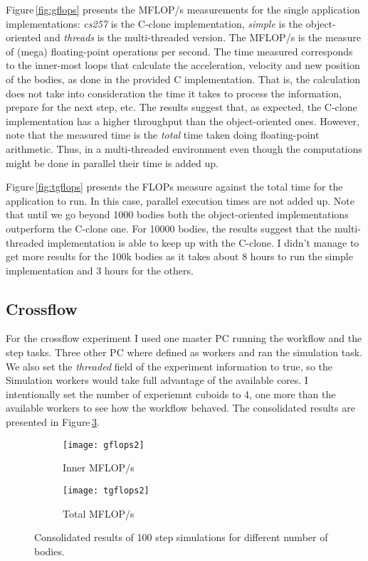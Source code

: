 \documentclass[11pt,a4paper]{article}
\begin{document}
Figure\,\ref{fig:gflops} presents the MFLOP/s measurements for the single application implementations: \emph{cs257} is the C-clone implementation, \emph{simple} is the object-oriented and \emph{threads} is the multi-threaded version.
The MFLOP/s is the measure of (mega) floating-point operations per second.
The time measured corresponds to the inner-most loops that calculate the acceleration, velocity and new position of the bodies, as done in the provided C implementation.
That is, the calculation does not take into consideration the time it takes to process the information, prepare for the next step, etc.
The results suggest that, as expected, the C-clone implementation has a higher throughput than the object-oriented ones.
However, note that the measured time is the \emph{total} time taken doing floating-point arithmetic.
Thus, in a multi-threaded environment even though the computations might be done in parallel their time is added up.

Figure\,\ref{fig:tgflops} presents the FLOPs measure against the total time for the application to run.
In this case, parallel execution times are not added up.
Note that until we go beyond 1000 bodies both the object-oriented implementations outperform the C-clone one.
For 10000 bodies, the results suggest that the multi-threaded implementation is able to keep up with the C-clone.
I didn't manage to get more results for the 100k bodies as it takes about 8 hours to run the simple implementation and 3 hours for the others.

\subsection{Crossflow}

For the crossflow experiment I used one master PC running the workflow and the step tasks.
Three other PC where defined as workers and ran the simulation task.
We also set the \emph{threaded} field of the experiment information to true, so the Simulation workers would take full advantage of the available cores.
I intentionally set the number of experiemnt cuboids to 4, one more than the available workers to see how the workflow behaved.
The consolidated results are presented in Figure\,\ref{fig:crossflow}.

\begin{figure}
    \centering
    \begin{subfigure}{.5\textwidth}
        \centering
        \texttt{[image: gflops2]}
        \caption{Inner MFLOP/s}
        \label{fig:gflops2}
    \end{subfigure}%
    \begin{subfigure}{.5\textwidth}
        \centering
        \texttt{[image: tgflops2]}
        \caption{Total MFLOP/s}
        \label{fig:tgflops2}
    \end{subfigure}%
\caption{Consolidated results of 100 step simulations for different number of bodies.}
\label{fig:crossflow}
\end{figure}
\end{document}
